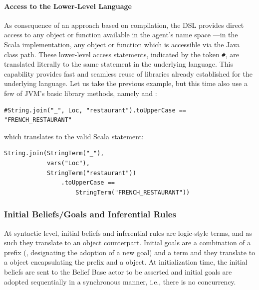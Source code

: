 \paragraph{Access to the Lower-Level Language} As consequence of an approach based on compilation, the DSL provides direct access to any object or function available in the agent's name space ---in the Scala implementation, any object or function which is accessible via the Java class path. These lower-level access statements, indicated by the token \verb+#+, are translated literally to the same statement in the underlying language. This capability provides fast and seamless reuse of libraries already established for the underlying language. Let us take the previous example, but this time also use a few of JVM's basic library methods, namely  and :
\begin{verbatim}
#String.join("_", Loc, "restaurant").toUpperCase == "FRENCH_RESTAURANT"
\end{verbatim}
\noindent which translates to the valid Scala statement:
\begin{verbatim}
String.join(StringTerm("_"),
            vars("Loc"),
            StringTerm("restaurant"))
                .toUpperCase == 
                    StringTerm("FRENCH_RESTAURANT"))
\end{verbatim}

\subsubsection{Initial Beliefs/Goals and Inferential Rules}
At syntactic level, initial beliefs and inferential rules are logic-style terms, and as such they translate to an  object counterpart. Initial goals are a combination of a prefix (\asc{!}, designating the adoption of a new goal)
and a term and they translate to a  object encapsulating the prefix and a  object. At initialization time, the initial beliefs are sent to the Belief Base actor to be asserted and initial goals are adopted sequentially in a synchronous manner, i.e., there is no concurrency.

